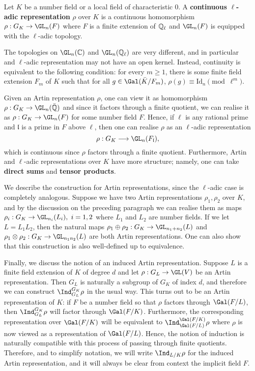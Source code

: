 \begin{defn}
    Let $K$ be a number field or a local field of characteristic $0$. A \textbf{continuous $\ell$-adic representation} $\rho$ over $K$ is a continuous homomorphism $\rho:G_K\to\GL_n(F)$ where $F$ is a finite extension of $\mathbb{Q}_\ell$ and $\GL_n(F)$ is equipped with the $\ell$-adic topology.
\end{defn}

\begin{rem} \label{rem_cont_ladic}
    The topologies on $\GL_n(\CC)$ and $\GL_n(\QQ_\ell)$ are very different, and in particular and $\ell$-adic representation may not have an open kernel. Instead, continuity is equivalent to the following condition: for every $m\geq1$, there is some finite field extension $F_m$ of $K$ such that for all $g\in\Gal(\bar{K}/F_m)$, $\rho(g)\equiv \mathrm{Id}_n\pmod{\ell^m}$.
\end{rem}

Given an Artin representation $\rho$, one can view it as homomorphism $\rho:G_K\to\GL_n(\bar{\QQ})$ and since it factors through a finite quotient, we can realise it as $\rho:G_K\to\GL_n(F)$ for some number field $F$. Hence, if $\ell$ is any rational prime and $\mathfrak{l}$ is a prime in $F$ above $\ell$, then one can realise $\rho$ as an $\ell$-adic representation $$\rho:G_K\longrightarrow\GL_n(F_\mathfrak{l}),$$
which is continuous since $\rho$ factors through a finite quotient. Furthermore, Artin and $\ell$-adic representations over $K$ have more structure; namely, one can take \textbf{direct sums} and \textbf{tensor products}.

We describe the construction for Artin representations, since the $\ell$-adic case is completely analogous. Suppose we have two Artin representations $\rho_1,\rho_2$ over $K$, and by the discussion on the preceding paragraph we can realise them as maps $\rho_i:G_K\to\GL_{n_i}(L_i),\ i=1,2$ where $L_1$ and $L_2$ are number fields. If we let $L=L_1L_2$, then the natural maps $\rho_1\oplus\rho_2:G_K\to\GL_{n_1+n_2}(L)$ and $\rho_1\otimes\rho_2:G_K\to\GL_{n_1n_2}(L)$ are both Artin representations. One can also show that this construction is also well-defined up to equivalence.

Finally, we discuss the notion of an induced Artin representation. Suppose $L$ is a finite field extension of $K$ of degree $d$ and let $\rho:G_L\to\GL(V)$ be an Artin representation. Then $G_L$ is naturally a subgroup of $G_K$ of index $d$, and therefore we can construct $\Ind_{G_L}^{G_K}\rho$ in the usual way. This turns out to be an Artin representation of $K$: if $F$ be a number field so that $\rho$ factors through $\Gal(F/L)$, then $\Ind_{G_L}^{G_K}\rho$ will factor through $\Gal(F/K)$. Furthermore, the corresponding representation over $\Gal(F/K)$ will be equivalent to $\Ind_{\Gal(F/L)}^{\Gal(F/K)}\rho$ where $\rho$ is now viewed as a representation of $\Gal(F/L)$. Hence, the notion of induction is naturally compatible with this process of passing through finite quotients. Therefore, and to simplify notation, we will write $\Ind_{L/K}\rho$ for the induced Artin representation, and it will always be clear from context the implicit field $F$.

